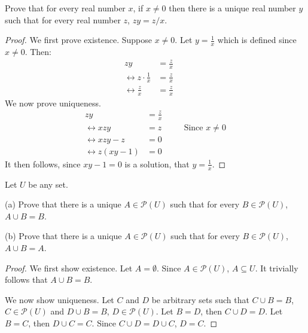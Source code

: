 \begin{tcolorbox}[title=Problem 4, breakable]
    Prove that for every real number $x$, if $x \not = 0$ then there is 
    a unique real number $y$ such that for every real number $z$, $zy = z / x$.
\end{tcolorbox}

\begin{proof}
    We first prove existence. 
    Suppose $x \not = 0$.
    Let $y = \frac{1}{x}$ which is defined since $x \not = 0$.
    Then:
    \begin{align*}
        zy                                  & = \frac{z}{x} &  &   \\
        \leftrightarrow z \cdot \frac{1}{x} & = \frac{z}{x} &  &   \\
        \leftrightarrow \frac{z}{x}         & = \frac{z}{x} &  & 
    \end{align*}
    We now prove uniqueness.
    \begin{align*}
        zy                        & = \frac{z}{x} &  &                                \\
        \leftrightarrow xzy       & = z           &  & \quad\text{Since $x \not = 0$} \\
        \leftrightarrow xzy - z   & = 0           &  &                                \\
        \leftrightarrow z(xy - 1) & = 0           &  & 
    \end{align*}
    It then follows, since $xy - 1  = 0$ is a solution, that $y = \frac{1}{x}$.
\end{proof}

\begin{tcolorbox}[title=Problem 6, breakable]
    Let $U$ be any set.

    (a) Prove that there is a unique $A \in \mathcal{P}(U)$ such 
    that for every $B \in \mathcal{P}(U)$, $A \cup B  = B$.

    (b) Prove that there is a unique $A \in \mathcal{P}(U)$ such 
    that for every $B \in \mathcal{P}(U)$, $A \cup B = A$.
\end{tcolorbox}

\begin{proof}
    We first show existence.
    Let $A = \emptyset$.
    Since $A \in \mathcal{P}(U)$, $A \subseteq U$.
    It trivially follows that $A \cup B = B$.

    We now show uniqueness. Let $C$ and $D$ be arbitrary sets such that $C \cup B =
        B$, $C \in \mathcal{P}(U)$ and $D \cup B = B$, $D \in \mathcal{P}(U)$. Let $B =
        D$, then $C \cup D = D$. Let $B = C$, then $D \cup C = C$. Since $C \cup D = D
        \cup C$, $D = C$.
\end{proof}

